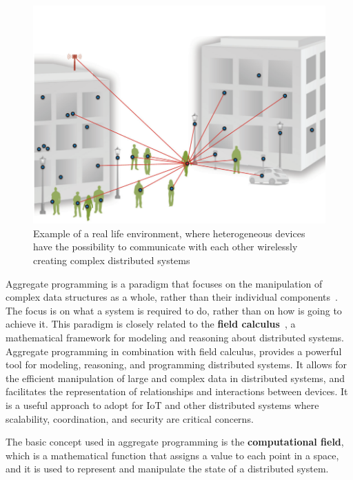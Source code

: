 \begin{figure}[!ht]
    \centering
    \includegraphics[scale=0.8]{document/chapters/1-introduction/images/iot_connected_things.png}
    \caption{Example of a real life environment, where heterogeneous devices have the possibility to communicate with each other wirelessly creating complex distributed systems~\cite{aggregate_programmig_iot}}
    \label{fig:iot_connected_things}
\end{figure}

Aggregate programming is a paradigm that focuses on the manipulation of complex data structures as a whole, rather than their individual components~\cite{aggregate_programmig_iot}. The focus is on what a system is required to do, rather than on how is going to achieve it.\newline
This paradigm is closely related to the \textbf{field calculus}~\cite{field_calculus}, a mathematical framework for modeling and reasoning about distributed systems.\newline
Aggregate programming in combination with field calculus, provides a powerful tool for modeling, reasoning, and programming distributed systems. It allows for the efficient manipulation of large and complex data in distributed systems, and facilitates the representation of relationships and interactions between devices. It is a useful approach to adopt for IoT and other distributed systems where scalability, coordination, and security are critical concerns.

The basic concept used in aggregate programming is the \textbf{computational field}, which is a mathematical function that assigns a value to each point in a space, and it is used to represent and manipulate the state of a distributed system.

